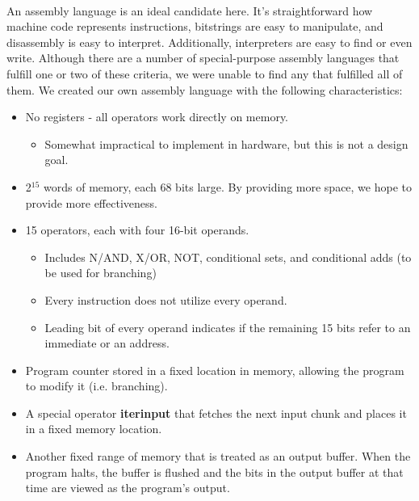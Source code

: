\documentclass{article}
\begin{document}
\paragraph{}
An assembly language is an ideal candidate here. It's straightforward how machine code represents instructions, bitstrings are easy to manipulate, and disassembly is easy to interpret. Additionally, interpreters are easy to find or even write.
Although there are a number of special-purpose assembly languages that fulfill one or two of these criteria, we were unable to find any that fulfilled all of them. We created our own assembly language with the following characteristics:

\begin{itemize}
\item No registers - all operators work directly on memory.
	\begin{itemize}
          \item Somewhat impractical to implement in hardware, but this is not a design goal.
	\end{itemize}
	\item 2$^{15}$ words of memory, each 68 bits large. By providing more space, we hope to provide more effectiveness.
	\item 15 operators, each with four 16-bit operands.
	\begin{itemize}
		  \item Includes N/AND, X/OR, NOT, conditional sets, and conditional adds (to be used for branching)
          \item Every instruction does not utilize every operand.
          \item Leading bit of every operand indicates if the remaining 15 bits refer to an immediate or an address.
	\end{itemize}
	\item Program counter stored in a fixed location in memory, allowing the program to modify it (i.e. branching).
	\item A special operator \textbf{iterinput} that fetches the next input chunk and places it in a fixed memory location.
	\item Another fixed range of memory that is treated as an output buffer. When the program halts, the buffer is flushed and the bits in the output buffer at that time are viewed as the program's output.
\end{itemize}
\end{document}
